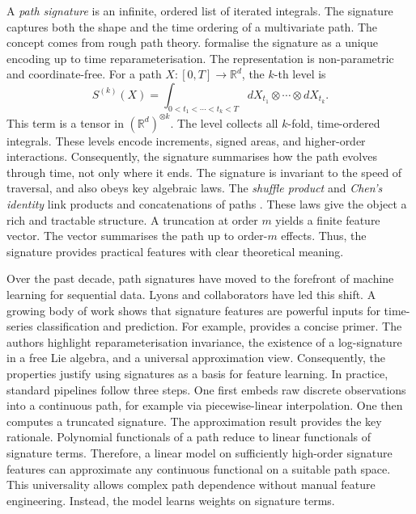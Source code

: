 A \emph{path signature} is an infinite, ordered list of iterated integrals\cite{issa2023nonparametriconlinemarketregime}. The signature captures both the shape and the time ordering of a multivariate path. The concept comes from rough path theory. \cite{Lyons1998} formalise the signature as a unique encoding up to time reparameterisation. The representation is non-parametric and coordinate-free.
For a path $X:[0,T]\to\mathbb{R}^d$, the $k$-th level is
\[
S^{(k)}(X)
=\int_{0<t_1<\cdots<t_k<T} dX_{t_1}\otimes\cdots\otimes dX_{t_k}.
\]
This term is a tensor in $(\mathbb{R}^d)^{\otimes k}$. The level collects all $k$-fold, time-ordered integrals. These levels encode increments, signed areas, and higher-order interactions. Consequently, the signature summarises how the path evolves through time, not only where it ends. The signature is invariant to the speed of traversal, and also obeys key algebraic laws. The \emph{shuffle product} and \emph{Chen's identity} link products and concatenations of paths \cite{https://doi.org/10.1112/plms/s3-4.1.502}. These laws give the object a rich and tractable structure. A truncation at order $m$ yields a finite feature vector. The vector summarises the path up to order-$m$ effects. Thus, the signature provides practical features with clear theoretical meaning.

Over the past decade, path signatures have moved to the forefront of machine learning for sequential data. Lyons and collaborators have led this shift. A growing body of work shows that signature features are powerful inputs for time-series classification and prediction. For example, \cite{chevyrev2025primersignaturemethodmachine} provides a concise primer. The authors highlight reparameterisation invariance, the existence of a log-signature in a free Lie algebra, and a universal approximation view. Consequently, the properties justify using signatures as a basis for feature learning. In practice, standard pipelines follow three steps. One first embeds raw discrete observations into a continuous path, for example via piecewise-linear interpolation. One then computes a truncated signature. The approximation result provides the key rationale. Polynomial functionals of a path reduce to linear functionals of signature terms. Therefore, a linear model on sufficiently high-order signature features can approximate any continuous functional on a suitable path space. This universality allows complex path dependence without manual feature engineering. Instead, the model learns weights on signature terms.


